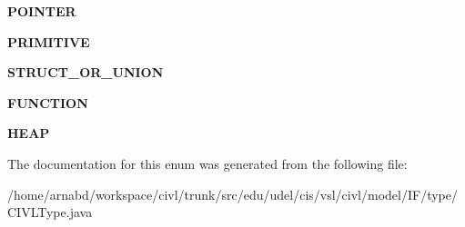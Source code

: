 \begin{DoxyCompactItemize}
\item 
\hypertarget{enumedu_1_1udel_1_1cis_1_1vsl_1_1civl_1_1model_1_1IF_1_1type_1_1CIVLType_1_1TypeKind_abf9c8da423338c24c41a0333f2952eb5}{}{\bfseries P\+O\+I\+N\+T\+E\+R}\label{enumedu_1_1udel_1_1cis_1_1vsl_1_1civl_1_1model_1_1IF_1_1type_1_1CIVLType_1_1TypeKind_abf9c8da423338c24c41a0333f2952eb5}

\item 
\hypertarget{enumedu_1_1udel_1_1cis_1_1vsl_1_1civl_1_1model_1_1IF_1_1type_1_1CIVLType_1_1TypeKind_aee692e4c9101c392bc85cd49ce9ccc6b}{}{\bfseries P\+R\+I\+M\+I\+T\+I\+V\+E}\label{enumedu_1_1udel_1_1cis_1_1vsl_1_1civl_1_1model_1_1IF_1_1type_1_1CIVLType_1_1TypeKind_aee692e4c9101c392bc85cd49ce9ccc6b}

\item 
\hypertarget{enumedu_1_1udel_1_1cis_1_1vsl_1_1civl_1_1model_1_1IF_1_1type_1_1CIVLType_1_1TypeKind_ace58a697daa2119f7a65bbb9d0ebcf9d}{}{\bfseries S\+T\+R\+U\+C\+T\+\_\+\+O\+R\+\_\+\+U\+N\+I\+O\+N}\label{enumedu_1_1udel_1_1cis_1_1vsl_1_1civl_1_1model_1_1IF_1_1type_1_1CIVLType_1_1TypeKind_ace58a697daa2119f7a65bbb9d0ebcf9d}

\item 
\hypertarget{enumedu_1_1udel_1_1cis_1_1vsl_1_1civl_1_1model_1_1IF_1_1type_1_1CIVLType_1_1TypeKind_a1d29ddd7ecd31e036a7188c9864dd58e}{}{\bfseries F\+U\+N\+C\+T\+I\+O\+N}\label{enumedu_1_1udel_1_1cis_1_1vsl_1_1civl_1_1model_1_1IF_1_1type_1_1CIVLType_1_1TypeKind_a1d29ddd7ecd31e036a7188c9864dd58e}

\item 
\hypertarget{enumedu_1_1udel_1_1cis_1_1vsl_1_1civl_1_1model_1_1IF_1_1type_1_1CIVLType_1_1TypeKind_aaba18c307a051796fb0c09861ff8d571}{}{\bfseries H\+E\+A\+P}\label{enumedu_1_1udel_1_1cis_1_1vsl_1_1civl_1_1model_1_1IF_1_1type_1_1CIVLType_1_1TypeKind_aaba18c307a051796fb0c09861ff8d571}

\end{DoxyCompactItemize}


The documentation for this enum was generated from the following file\+:\begin{DoxyCompactItemize}
\item 
/home/arnabd/workspace/civl/trunk/src/edu/udel/cis/vsl/civl/model/\+I\+F/type/C\+I\+V\+L\+Type.\+java\end{DoxyCompactItemize}
